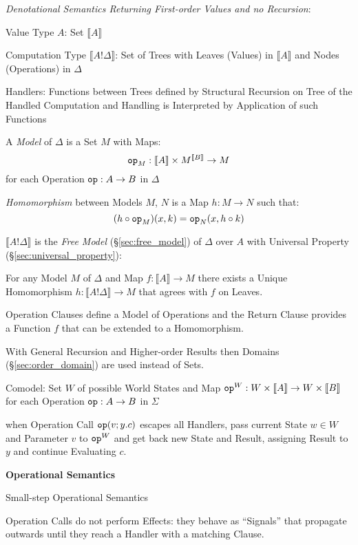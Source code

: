 \emph{Denotational Semantics Returning First-order Values and no
  Recursion}:

Value Type $A$: Set $\llbracket A \rrbracket$

Computation Type $\llbracket A!\Delta \rrbracket$: Set of Trees with
Leaves (Values) in $\llbracket A \rrbracket$ and Nodes (Operations) in
$\Delta$

Handlers: Functions between Trees defined by Structural Recursion on
Tree of the Handled Computation and Handling is Interpreted by
Application of such Functions

A \emph{Model} of $\Delta$ is a Set $M$ with Maps:
\[
  \mathtt{op}_M : \llbracket A \rrbracket
    \times M^{\llbracket B \rrbracket} \rightarrow M
\]
for each Operation $\mathtt{op} : A \rightarrow B$ in $\Delta$

\emph{Homomorphism} between Models $M$, $N$ is a Map $h : M
\rightarrow N$ such that:
\[
  (h \circ \mathtt{op}_M)(x,k) = \mathtt{op}_N(x,h \circ k)
\]

$\llbracket A ! \Delta \rrbracket$ is the \emph{Free Model}
(\S\ref{sec:free_model}) of $\Delta$ over $A$ with Universal Property
(\S\ref{sec:universal_property}):

For any Model $M$ of $\Delta$ and Map $f : \llbracket A \rrbracket
\rightarrow M$ there exists a Unique Homomorphism $h : \llbracket A !
\Delta \rrbracket \rightarrow M$ that agrees with $f$ on Leaves.
\cite{pretnar15}

Operation Clauses define a Model of Operations and the Return Clause
provides a Function $f$ that can be extended to a Homomorphism.
\cite{pretnar15}

\fist With General Recursion and Higher-order Results then
Domains (\S\ref{sec:order_domain}) are used instead of Sets.

Comodel: Set $W$ of possible World States and Map $\mathtt{op}^W : W
\times \llbracket A \rrbracket \rightarrow W \times \llbracket B
\rrbracket$ for each Operation $\mathtt{op} : A \rightarrow B$ in
$\Sigma$

when Operation Call $\mathtt{op}(v; y.c)$ escapes all Handlers, pass
current State $w \in W$ and Parameter $v$ to $\mathtt{op}^W$ and get
back new State and Result, assigning Result to $y$ and continue
Evaluating $c$. \cite{pretnar15}


\textbf{Operational Semantics} \cite{pretnar15}

Small-step Operational Semantics

Operation Calls do not perform Effects: they behave as ``Signals''
that propagate outwards until they reach a Handler with a matching
Clause. \cite{pretnar15}

